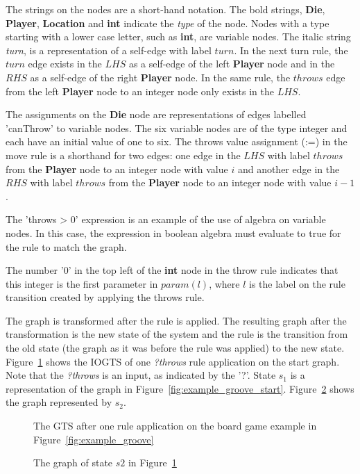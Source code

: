 The strings on the nodes are a short-hand notation. The bold strings, \textbf{Die}, \textbf{Player}, \textbf{Location} and \textbf{int} indicate the \textit{type} of the node. Nodes with a type starting with a lower case letter, such as \textbf{int}, are variable nodes. The italic string \textit{turn}, is a representation of a self-edge with label $turn$. In the next turn rule, the $turn$ edge exists in the $\mathit{LHS}$ as a self-edge of the left \textbf{Player} node and in the $\mathit{RHS}$ as a self-edge of the right \textbf{Player} node. In the same rule, the $throws$ edge from the left \textbf{Player} node to an integer node only exists in the $\mathit{LHS}$.

The assignments on the \textbf{Die} node are representations of edges labelled 'canThrow' to variable nodes. The six variable nodes are of the type integer and each have an initial value of one to six. The throws value assignment (:=) in the move rule is a shorthand for two edges: one edge in the $\mathit{LHS}$ with label $throws$ from the \textbf{Player} node to an integer node with value $i$ and another edge in the $\mathit{RHS}$ with label $throws$ from the \textbf{Player} node to an integer node with value $i-1$. 

The 'throws > 0' expression is an example of the use of algebra on variable nodes. In this case, the expression in boolean algebra must evaluate to true for the rule to match the graph.

The number '0' in the top left of the \textbf{int} node in the throw rule indicates that this integer is the first parameter in $param(l)$, where $l$ is the label on the rule transition created by applying the throws rule.

The graph is transformed after the rule is applied. The resulting graph after the transformation is the new state of the system and the rule is the transition from the old state (the graph as it was before the rule was applied) to the new state. Figure~\ref{fig:gts_example} shows the IOGTS of one \textit{?throws} rule application on the start graph. Note that the \textit{?throws} is an input, as indicated by the '?'. State $s_1$ is a representation of the graph in Figure~\ref{fig:example_groove_start}. Figure~\ref{fig:target_graph_state} shows the graph represented by $s_2$.

\begin{figure}[ht]
  \begin{center}
    
  \end{center}
  \caption{The GTS after one rule application on the board game example in Figure~\ref{fig:example_groove}}
  \label{fig:gts_example}
\end{figure}

\begin{figure}[ht]
  \begin{center}
    
  \end{center}
  \caption{The graph of state $s2$ in Figure~\ref{fig:gts_example}}
  \label{fig:target_graph_state}
\end{figure}
